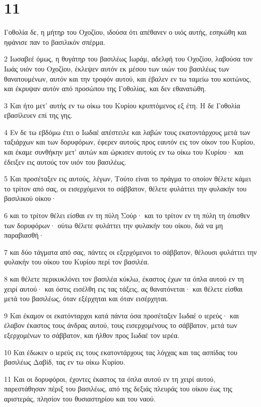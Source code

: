 \chapter{11}

\par Γοθολία δε, η μήτηρ του Οχοζίου, ιδούσα ότι απέθανεν ο υιός αυτής, εσηκώθη και ηφάνισε παν το βασιλικόν σπέρμα.
\par 2 Ιωσαβεέ όμως, η θυγάτηρ του βασιλέως Ιωράμ, αδελφή του Οχοζίου, λαβούσα τον Ιωάς υιόν του Οχοζίου, έκλεψεν αυτόν εκ μέσου των υιών του βασιλέως των θανατουμένων, αυτόν και την τροφόν αυτού, και έβαλεν εν τω ταμείω του κοιτώνος, και έκρυψαν αυτόν από προσώπου της Γοθολίας, και δεν εθανατώθη.
\par 3 Και ήτο μετ' αυτής εν τω οίκω του Κυρίου κρυπτόμενος εξ έτη. Η δε Γοθολία εβασίλευεν επί της γης.
\par 4 Εν δε τω εβδόμω έτει ο Ιωδαέ απέστειλε και λαβών τους εκατοντάρχους μετά των ταξιάρχων και των δορυφόρων, έφερεν αυτούς προς εαυτόν εις τον οίκον του Κυρίου, και έκαμε συνθήκην μετ' αυτών και ώρκισεν αυτούς εν τω οίκω του Κυρίου· και έδειξεν εις αυτούς τον υιόν του βασιλέως.
\par 5 Και προσέταξεν εις αυτούς, λέγων, Τούτο είναι το πράγμα το οποίον θέλετε κάμει το τρίτον από σας, οι εισερχόμενοι το σάββατον, θέλετε φυλάττει την φυλακήν του βασιλικού οίκου·
\par 6 και το τρίτον θέλει είσθαι εν τη πύλη Σούρ· και το τρίτον εν τη πύλη τη όπισθεν των δορυφόρων· ούτω θέλετε φυλάττει την φυλακήν του οίκου, διά να μη παραβιασθή·
\par 7 και δύο τάγματα από σας, πάντες οι εξερχόμενοι το σάββατον, θέλουσι φυλάττει την φυλακήν του οίκου του Κυρίου περί τον βασιλέα.
\par 8 και θέλετε περικυκλόνει τον βασιλέα κύκλω, έκαστος έχων τα όπλα αυτού εν τη χειρί αυτού· και όστις εισέλθη εις τας τάξεις, ας θανατόνεται· και θέλετε είσθαι μετά του βασιλέως, όταν εξέρχηται και όταν εισέρχηται.
\par 9 Και έκαμον οι εκατόνταρχοι κατά πάντα όσα προσέταξεν Ιωδαέ ο ιερεύς· και έλαβον έκαστος τους άνδρας αυτού, τους εισερχομένους το σάββατον, μετά των εξερχομένων το σάββατον, και ήλθον προς Ιωδαέ τον ιερέα.
\par 10 Και έδωκεν ο ιερεύς εις τους εκατοντάρχους τας λόγχας και τας ασπίδας του βασιλέως Δαβίδ, τας εν τω οίκω Κυρίου.
\par 11 Και οι δορυφόροι, έχοντες έκαστος τα όπλα αυτού εν τη χειρί αυτού, παρεστάθησαν πέριξ του βασιλέως, από της δεξιάς πλευράς του οίκου έως της αριστεράς, πλησίον του θυσιαστηρίου και του ναού.
